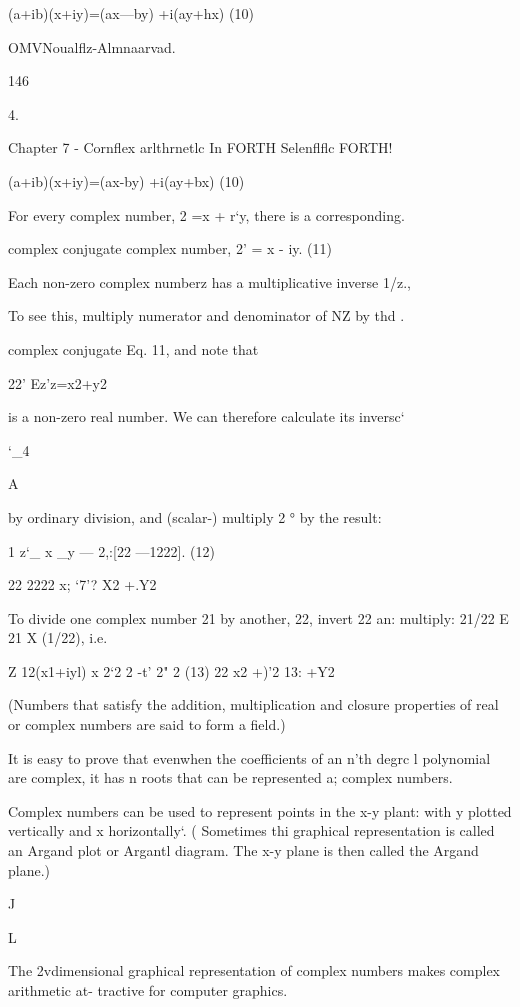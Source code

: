 (a+ib)(x+iy)=(ax—by) +i(ay+hx) (10)

OMVNoualﬂz-Almnaarvad.

146

4.

Chapter 7 - Cornﬂex arlthrnetlc In FORTH Selenﬂflc FORTH!

(a+ib)(x+iy)=(ax-by) +i(ay+bx) (10)

For every complex number, 2 =x + r‘y, there is a corresponding.

complex conjugate complex number,
2' = x - iy. (11)

Each non-zero complex numberz has a multiplicative inverse 1/z.,

To see this, multiply numerator and denominator of NZ by thd .

complex conjugate Eq. 11, and note that

22' Ez'z=x2+y2

is a non-zero real number. We can therefore calculate its inversc‘

‘_4

A

 

by ordinary division, and (scalar-) multiply 2 ° by the result:

1 z‘_ x _y
— 2,:[22 —1222]. (12)

 

22 2222 x; ‘7’? X2 +.Y2

To divide one complex number 21 by another, 22, invert 22 an:
multiply: 21/22 E 21 X (1/22), i.e.

 

 

Z
12(x1+iyl) x 2‘2 2 -t' 2" 2 (13)
22 x2 +)’2 13: +Y2

(Numbers that satisfy the addition, multiplication and closure
properties of real or complex numbers are said to form a ﬁeld.)

It is easy to prove that evenwhen the coefficients of an n’th degrc l
polynomial are complex, it has n roots that can be represented a;
complex numbers.

Complex numbers can be used to represent points in the x-y plant:
with y plotted vertically and x horizontally‘. ( Sometimes thi
graphical representation is called an Argand plot or Argantl
diagram. The x-y plane is then called the Argand plane.)

J

L

The 2vdimensional graphical representation of complex numbers makes complex arithmetic at-
tractive for computer graphics.

